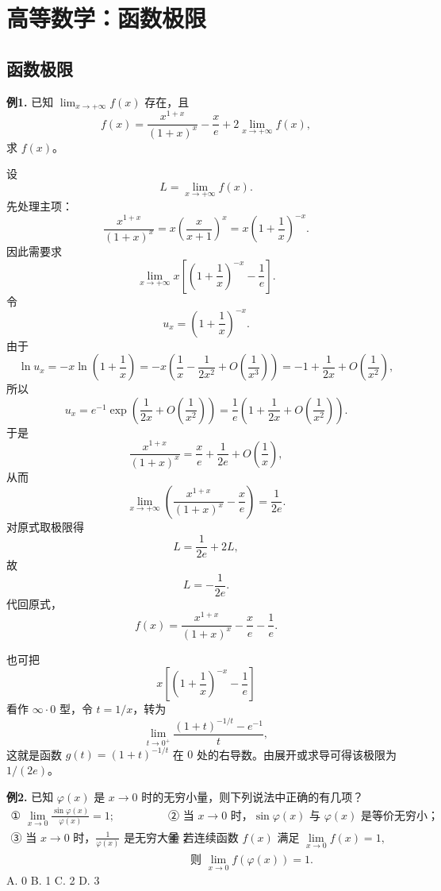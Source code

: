 \chapter{高等数学：函数极限}

\section{函数极限}

\begin{problemblock}
\textbf{例1.} 已知 \(\displaystyle \lim_{x\to+\infty}f(x)\) 存在，且
\[
f(x)=\frac{x^{1+x}}{(1+x)^x}-\frac{x}{e}
  +2\lim_{x\to+\infty}f(x),
\]
求 \(f(x)\)。
\end{problemblock}

\begin{solutionblock}

设
\[
L=\lim_{x\to+\infty}f(x).
\]
先处理主项：
\[
\frac{x^{1+x}}{(1+x)^x}
=x\left(\frac{x}{x+1}\right)^x
=x\left(1+\frac1x\right)^{-x}.
\]
因此需要求
\[
\lim_{x\to+\infty}x\left[\left(1+\frac1x\right)^{-x}-\frac1e\right].
\]
令
\[
u_x=\left(1+\frac1x\right)^{-x}.
\]
由于
\[
\ln u_x=-x\ln\left(1+\frac1x\right)
=-x\left(\frac1x-\frac1{2x^2}+O\left(\frac1{x^3}\right)\right)
=-1+\frac1{2x}+O\left(\frac1{x^2}\right),
\]
所以
\[
u_x=e^{-1}\exp\left(\frac1{2x}+O\left(\frac1{x^2}\right)\right)
=\frac1e\left(1+\frac1{2x}+O\left(\frac1{x^2}\right)\right).
\]
于是
\[
\frac{x^{1+x}}{(1+x)^x}
=\frac{x}{e}+\frac1{2e}+O\left(\frac1x\right),
\]
从而
\[
\lim_{x\to+\infty}\left(\frac{x^{1+x}}{(1+x)^x}-\frac{x}{e}\right)=\frac1{2e}.
\]
对原式取极限得
\[
L=\frac1{2e}+2L,
\]
故
\[
L=-\frac1{2e}.
\]
代回原式，
\[
f(x)=\frac{x^{1+x}}{(1+x)^x}-\frac{x}{e}-\frac1e.
\]

也可把
\[
x\left[\left(1+\frac1x\right)^{-x}-\frac1e\right]
\]
看作 \(\infty\cdot0\) 型，令 \(t=1/x\)，转为
\[
\lim_{t\to0^+}\frac{(1+t)^{-1/t}-e^{-1}}{t},
\]
这就是函数 \(g(t)=(1+t)^{-1/t}\) 在 \(0\) 处的右导数。由展开或求导可得该极限为 \(1/(2e)\)。

\end{solutionblock}

\begin{problemblock}
\textbf{例2.} 已知 \(\varphi(x)\) 是 \(x\to0\) 时的无穷小量，则下列说法中正确的有几项？
\[
\begin{array}{ll}
\text{① } \displaystyle\lim_{x\to0}\frac{\sin\varphi(x)}{\varphi(x)}=1; &
\text{② 当 }x\to0\text{ 时，}\sin\varphi(x)\text{ 与 }\varphi(x)\text{ 是等价无穷小；}\\[2mm]
\text{③ 当 }x\to0\text{ 时，}\displaystyle\frac1{\varphi(x)}\text{ 是无穷大量；}&
\text{④ 若连续函数 }f(x)\text{ 满足 }\displaystyle\lim_{x\to0}f(x)=1,\\
&\qquad\text{则 }\displaystyle\lim_{x\to0}f(\varphi(x))=1.
\end{array}
\]
A. 0 \qquad B. 1 \qquad C. 2 \qquad D. 3
\end{problemblock}

